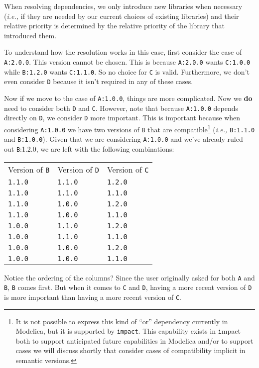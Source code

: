 \documentclass[11pt,a4paper,twocolumn]{article}
\renewcommand{\small}{\fontsize{9.5pt}{11.1pt}\selectfont}
\newcommand{\code}[1]{\texttt{#1}} %
\begin{document}
When resolving dependencies, we only introduce new libraries when
necessary (\emph{i.e.,} if they are needed by our current choices of
existing libraries) and their relative priority is determined by the
relative priority of the library that introduced them.

To understand how the resolution works in this case, first consider
the case of \code{A:2.0.0}.  This version cannot be chosen.  This is
because \code{A:2.0.0} wants \code{C:1.0.0} while \code{B:1.2.0}
wants \code{C:1.1.0}.  So no choice for \code{C} is valid.
Furthermore, we don't even consider \code{D} because it isn't
required in any of these cases.


Now if we move to the case of \code{A:1.0.0}, things are more
complicated.  Now we \textbf{do} need to consider both \code{D} and
\code{C}.  However, note that because \code{A:1.0.0} depends
directly on \code{D}, we consider \code{D} more important.  This is
important because when considering \code{A:1.0.0} we have two
versions of \code{B} that are compatible\footnote{It is not possible
  to express this kind of ``or'' dependency currently in Modelica, but
  it is supported by \code{impact}.  This capability exists in {\code
    impact} both to support anticipated future capabilities in
  Modelica \cite{} and/or to support cases we will discuss shortly
  that consider cases of compatibility implicit in semantic versions.}
(\emph{i.e.,} \code{B:1.1.0} and \code{B:1.0.0}).  Given that we are
considering \code{A:1.0.0} and we've already ruled out {\code
  B:1.2.0}, we are left with the following combinations:
{\small
\begin{center}
\begin{tabular}{ l l l }
  Version of \code{B} & Version of \code{D} & Version of \code{C} \\
  \code{1.1.0} & \code{1.1.0} & \code{1.2.0} \\
  \code{1.1.0} & \code{1.1.0} & \code{1.1.0} \\
  \code{1.1.0} & \code{1.0.0} & \code{1.2.0} \\
  \code{1.1.0} & \code{1.0.0} & \code{1.1.0} \\
  \code{1.0.0} & \code{1.1.0} & \code{1.2.0} \\
  \code{1.0.0} & \code{1.1.0} & \code{1.1.0} \\
  \code{1.0.0} & \code{1.0.0} & \code{1.2.0} \\
  \code{1.0.0} & \code{1.0.0} & \code{1.1.0} \\
\end{tabular}
\end{center}
}
Notice the ordering of the columns?  Since the user originally asked
for both \code{A} and \code{B}, \code{B} comes first.  But when it
comes to \code{C} and \code{D}, having a more recent version of
\code{D} is more important than having a more recent version of
\code{C}.
\end{document}
